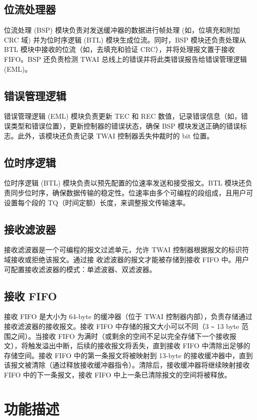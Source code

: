 \documentclass[main\_\_CN.tex]{subfiles}
\begin{document}
\subsection{位流处理器}
位流处理 (BSP) 模块负责对发送缓冲器的数据进行帧处理 (如，位填充和附加 CRC 域) 并为位时序逻辑 (BTL) 模块生成位流。同时，BSP 模块还负责处理从 BTL 模块中接收的位流（如，去填充和验证 CRC），并将处理报文置于接收 FIFO。BSP 还负责检测 TWAI 总线上的错误并将此类错误报告给错误管理逻辑 (EML)。

\subsection{错误管理逻辑}
错误管理逻辑 (EML) 模块负责更新 TEC 和 REC 数值，记录错误信息（如，错误类型和错误位置），更新控制器的错误状态，确保 BSP 模块发送正确的错误标志。此外，该模块还负责记录 TWAI 控制器丢失仲裁时的 bit 位置。

\subsection{位时序逻辑}
位时序逻辑 (BTL) 模块负责以预先配置的位速率发送和接受报文。BTL 模块还负责同步位时序，确保数据传输的稳定性。位速率由多个可编程的段组成，且用户可设置每个段的 TQ（时间定额）长度，来调整报文传输速率。

\subsection{接收滤波器}
接收滤波器是一个可编程的报文过滤单元，允许 TWAI 控制器根据报文的标识符域接收或拒绝该报文。通过接
收滤波器的报文才能被存储到接收 FIFO 中。用户可配置接收滤波器的模式：单滤波器、双滤波器。

\subsection{接收 FIFO}
接收 FIFO 是大小为 64-byte 的缓冲器（位于 TWAI 控制器内部），负责存储通过接收滤波器的接收报文。接收 FIFO 中存储的报文大小可以不同（3 \verb+~+ 13 byte 范围之间）。当接收 FIFO 为满时（或剩余的空间不足以完全存储下一个接收报文），将触发溢出中断，后续的接收报文将丢失，直到接收 FIFO 中清除出足够的存储空间。接收 FIFO 中的第一条报文将被映射到 13-byte 的接收缓冲器中，直到该报文被清除（通过释放接收缓冲器指令）。清除后，接收缓冲器将继续映射接收 FIFO 中的下一条报文，接收 FIFO 中上一条已清除报文的空间将被释放。

\section{功能描述}
\end{document}
